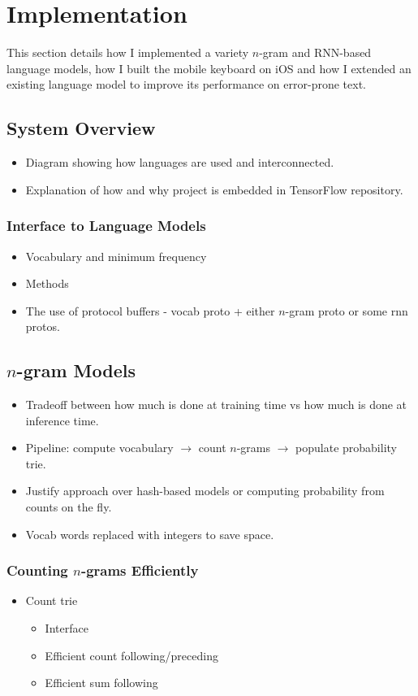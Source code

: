 \documentclass[a4paper, 12pt]{report}
\begin{document}
\chapter{Implementation} \label{implementation}

This section details how I implemented a variety $n$-gram and RNN-based language models, how I built the mobile keyboard on iOS and how I extended an existing language model to improve its performance on error-prone text.

\section{System Overview}



\begin{itemize}
\item
	Diagram showing how languages are used and interconnected.
\item
	Explanation of how and why project is embedded in TensorFlow repository.
\end{itemize}

\subsection{Interface to Language Models}
\begin{itemize}
\item
	Vocabulary and minimum frequency
\item
	Methods
\item
	The use of protocol buffers - vocab proto + either $n$-gram proto or some rnn protos.
\end{itemize}
\section{$n$-gram Models}
\begin{itemize}
\item
	Tradeoff between how much is done at training time vs how much is done at inference time.
\item
	Pipeline: compute vocabulary $\rightarrow$ count $n$-grams $\rightarrow$ populate probability trie.
\item
	Justify approach over hash-based models or computing probability from counts on the fly.
\item
	Vocab words replaced with integers to save space.
\end{itemize}
\subsection{Counting $n$-grams Efficiently}
\begin{itemize}
\item
	Count trie
	\begin{itemize}
	\item
		Interface
	\item
		Efficient count following/preceding
	\item
		Efficient sum following
	\end{itemize}
\end{itemize}
\end{document}
